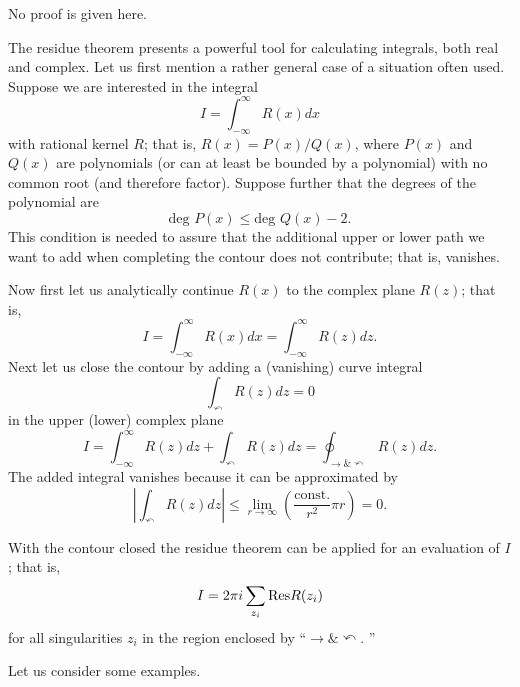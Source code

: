 No proof is given here.

The residue theorem presents a powerful tool for calculating integrals, both real and complex.
Let us first mention a rather general case of a situation often used.
Suppose we are interested in the integral
  $$I=\int_{-\infty}^{\infty} R(x) dx$$
with rational kernel $R$; that is, $R(x)= P(x)/Q(x)$,
where $P(x)$ and $Q(x)$
are polynomials (or can at least be bounded by a polynomial) with no common root (and therefore factor).
Suppose further that the degrees of the polynomial are
$$
\textrm{deg } P(x) \le
\textrm{deg } Q(x) -2.
$$
This condition is needed to assure that the additional upper or lower path we want to add when completing the contour
does not contribute; that is, vanishes.

Now first let us analytically continue $R(x)$ to the complex plane $R(z)$; that is,
$$I=\int_{-\infty}^{\infty} R(x) dx =\int_{-\infty}^{\infty} R(z) dz.$$
Next let us close the contour by adding a (vanishing) curve integral
$$\int_{\curvearrowleft} R(z) dz =
0$$
in the upper (lower) complex plane
$$I=\int_{-\infty}^{\infty} R(z) dz +\int_{\curvearrowleft} R(z) dz=\oint_{\rightarrow \& \curvearrowleft} R(z) dz.$$
The added integral vanishes because
it can be approximated by
$$\left| \int_{\curvearrowleft} R(z)  dz\right| \le \lim_{r\rightarrow \infty} \left(\frac{\textrm{const.}}{r^2} \pi r \right) =0.$$

With the contour closed the residue theorem can be applied  for an evaluation of $I$; that is,
$$I= 2\pi i \sum_{z_i} {\rm Res}R(z_i)$$
for all singularities $z_i$ in the region enclosed by ``$\rightarrow \& \curvearrowleft$. ''

Let us consider some examples.

